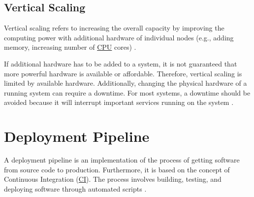 \subsection{Vertical Scaling}
\label{subsec:02_foundations_scalability_vertical-scaling}
Vertical scaling refers to increasing the overall capacity by improving the computing power with additional hardware of individual nodes (e.g., adding memory, increasing number of \hyperlink{abbr:cpu}{CPU} cores) \cite{Wilder2012CloudPatterns}.


If additional hardware has to be added to a system, it is not guaranteed that more powerful hardware is available or affordable.
Therefore, vertical scaling is limited by available hardware.
Additionally, changing the physical hardware of a running system can require a downtime. For most systems, a downtime should be avoided because it will interrupt important services running on the system \cite{Wilder2012CloudPatterns}.


\section{Deployment Pipeline}
\label{sec:02_depl-pipeline}
A deployment pipeline is an implementation of the process of getting software from source code to production.
Furthermore, it is based on the concept of Continuous Integration (\hyperlink{abbr:ci}{CI}).
The process involves building, testing, and deploying software through automated scripts \cite{Farley2010CI}.


